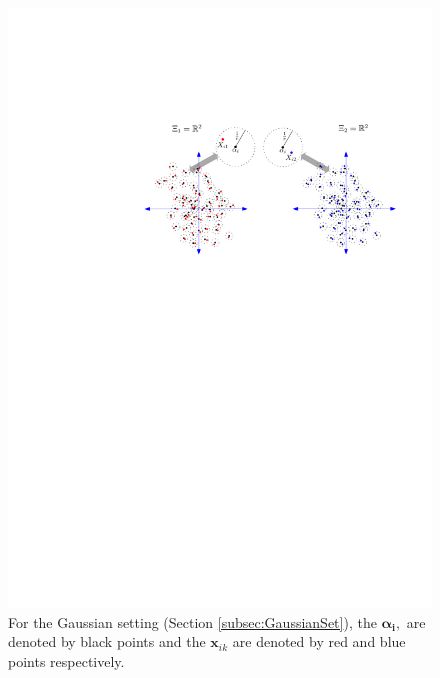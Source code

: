 \documentclass[11pt]{article} %
\begin{document}
    \begin{figure}
	\begin{center}
    \includegraphics[scale=0.55]{MVN_alpha_r_multiple_sancar.pdf}
    \caption{For the  Gaussian setting (Section \ref{subsec:GaussianSet}), the $\bm{\alpha_i},$ are denoted by black points and the $\bm{x}_{ik}$ are denoted by red and blue points respectively.}
\label{fig:Fig1}
	\end{center}
  \end{figure}

\end{document}
